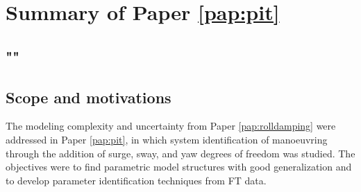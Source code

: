 \section{Summary of Paper \ref{pap:pit}}
\subsection*{""}
\subsection*{Scope and motivations}
The modeling complexity and uncertainty from Paper \ref{pap:rolldamping} were addressed in Paper \ref{pap:pit}, in which system identification of manoeuvring through the addition of surge, sway, and yaw degrees of freedom was studied. 
The objectives were to find parametric model structures with good generalization and to develop parameter identification techniques from FT data.

